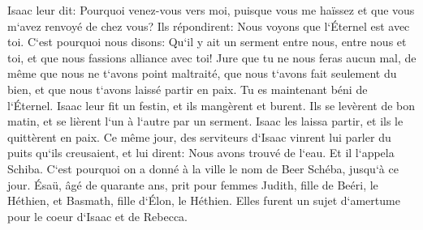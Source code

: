 \verse Isaac leur dit: Pourquoi venez-vous vers moi, puisque vous me haïssez et que vous m`avez renvoyé de chez vous? 
\verse Ils répondirent: Nous voyons que l`Éternel est avec toi. C`est pourquoi nous disons: Qu`il y ait un serment entre nous, entre nous et toi, et que nous fassions alliance avec toi! 
\verse Jure que tu ne nous feras aucun mal, de même que nous ne t`avons point maltraité, que nous t`avons fait seulement du bien, et que nous t`avons laissé partir en paix. Tu es maintenant béni de l`Éternel. 
\verse Isaac leur fit un festin, et ils mangèrent et burent. 
\verse Ils se levèrent de bon matin, et se lièrent l`un à l`autre par un serment. Isaac les laissa partir, et ils le quittèrent en paix. 
\verse Ce même jour, des serviteurs d`Isaac vinrent lui parler du puits qu`ils creusaient, et lui dirent: Nous avons trouvé de l`eau. 
\verse Et il l`appela Schiba. C`est pourquoi on a donné à la ville le nom de Beer Schéba, jusqu`à ce jour. 
\verse Ésaü, âgé de quarante ans, prit pour femmes Judith, fille de Beéri, le Héthien, et Basmath, fille d`Élon, le Héthien. 
\verse Elles furent un sujet d`amertume pour le coeur d`Isaac et de Rebecca. 

